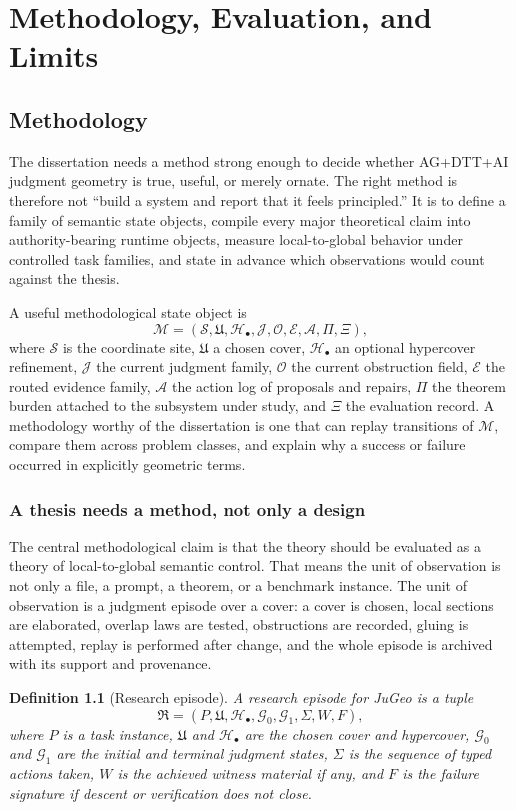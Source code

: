 \documentclass[11pt]{report}
\newtheorem{definition}{Definition}[chapter]
\begin{document}
\part{Methodology, Evaluation, and Limits}
\chapter{Methodology}
The dissertation needs a method strong enough to decide whether AG+DTT+AI judgment geometry is true, useful, or merely ornate. The right method is therefore not ``build a system and report that it feels principled.'' It is to define a family of semantic state objects, compile every major theoretical claim into authority-bearing runtime objects, measure local-to-global behavior under controlled task families, and state in advance which observations would count against the thesis.

A useful methodological state object is
\[
\mathcal{M}
=
(\mathcal{S},\mathfrak{U},\mathcal{H}_\bullet,\mathcal{J},\mathcal{O},\mathcal{E},\mathcal{A},\Pi,\Xi),
\]
where $\mathcal{S}$ is the coordinate site, $\mathfrak{U}$ a chosen cover, $\mathcal{H}_\bullet$ an optional hypercover refinement, $\mathcal{J}$ the current judgment family, $\mathcal{O}$ the current obstruction field, $\mathcal{E}$ the routed evidence family, $\mathcal{A}$ the action log of proposals and repairs, $\Pi$ the theorem burden attached to the subsystem under study, and $\Xi$ the evaluation record. A methodology worthy of the dissertation is one that can replay transitions of $\mathcal{M}$, compare them across problem classes, and explain why a success or failure occurred in explicitly geometric terms.

\section{A thesis needs a method, not only a design}
The central methodological claim is that the theory should be evaluated as a theory of local-to-global semantic control. That means the unit of observation is not only a file, a prompt, a theorem, or a benchmark instance. The unit of observation is a judgment episode over a cover: a cover is chosen, local sections are elaborated, overlap laws are tested, obstructions are recorded, gluing is attempted, replay is performed after change, and the whole episode is archived with its support and provenance.

\begin{definition}[Research episode]
A research episode for JuGeo is a tuple
\[
\mathfrak{R}
=
(P,\mathfrak{U},\mathcal{H}_\bullet,\mathcal{G}_0,\mathcal{G}_1,\Sigma,W,F),
\]
where $P$ is a task instance, $\mathfrak{U}$ and $\mathcal{H}_\bullet$ are the chosen cover and hypercover, $\mathcal{G}_0$ and $\mathcal{G}_1$ are the initial and terminal judgment states, $\Sigma$ is the sequence of typed actions taken, $W$ is the achieved witness material if any, and $F$ is the failure signature if descent or verification does not close.
\end{definition}
\end{document}

